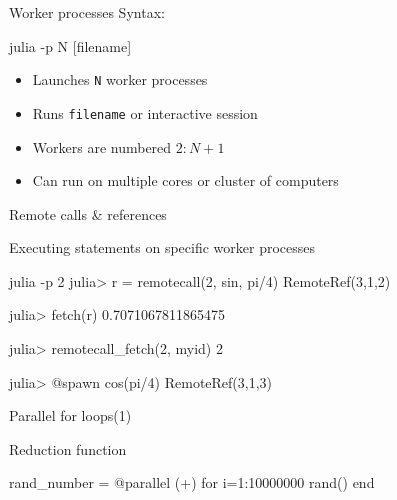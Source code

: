 \documentclass{beamer}
\begin{document}
	\begin{frame}[fragile]{Worker processes}
		Syntax:
		\begin{semiverbatim}
			julia -p N [filename]
		\end{semiverbatim}
		\begin{itemize}
			\item{Launches \verb+N+ worker processes}
			\item{Runs \verb+filename+ or interactive session}
			\item{Workers are numbered $2:N+1$}
			\item{Can run on multiple cores or cluster of computers}
		\end{itemize}
	\end{frame}

	\begin{frame}[fragile]{Remote calls \& references}
		\begin{block}{Executing statements on specific worker processes}
		\begin{semiverbatim}
		julia -p 2
		julia> r = remotecall(2, sin, pi/4)
		RemoteRef(3,1,2) 

		julia> fetch(r)
		0.7071067811865475

		julia> remotecall\_fetch(2, myid)
		2
		
		julia> @spawn cos(pi/4) 
		RemoteRef(3,1,3)
		\end{semiverbatim}
		\end{block}
	\end{frame}

	\begin{frame}[fragile]{Parallel for loops(1)}
		\begin{block}{Reduction function}	
		\begin{semiverbatim}
		rand\_number = @parallel (+) for i=1:10000000
		  rand()
		end
		\end{semiverbatim}
		\end{block}
	\end{frame}
\end{document}
